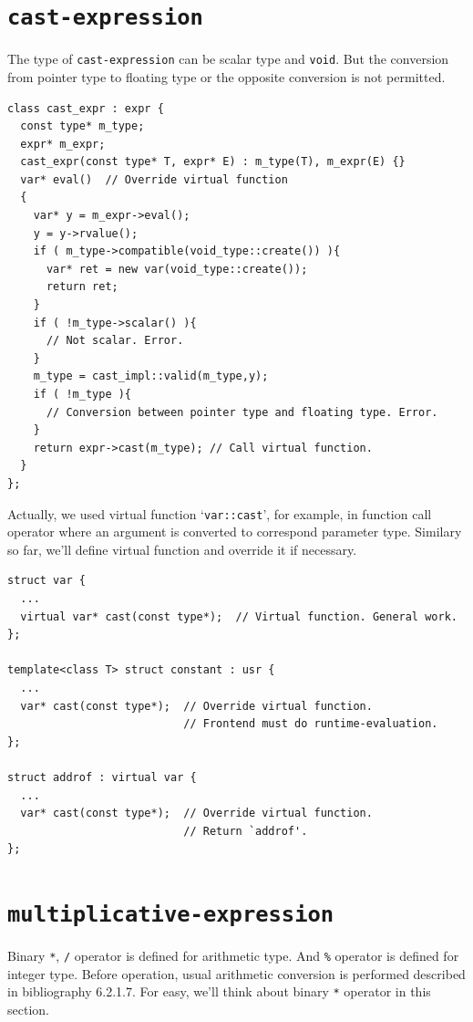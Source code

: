 \section{\tt{cast-expression}}

The type of {\tt{cast-expression}} can be scalar type
and {\tt{void}}. But the conversion from pointer type to floating type
or the opposite conversion is not permitted.
\begin{verbatim}
class cast_expr : expr {
  const type* m_type;
  expr* m_expr;
  cast_expr(const type* T, expr* E) : m_type(T), m_expr(E) {}
  var* eval()  // Override virtual function
  {
    var* y = m_expr->eval();
    y = y->rvalue();
    if ( m_type->compatible(void_type::create()) ){
      var* ret = new var(void_type::create());
      return ret;
    }
    if ( !m_type->scalar() ){
      // Not scalar. Error.
    }
    m_type = cast_impl::valid(m_type,y);
    if ( !m_type ){
      // Conversion between pointer type and floating type. Error.
    }
    return expr->cast(m_type); // Call virtual function.
  }
};
\end{verbatim}
Actually, we used virtual function `{\tt{var::cast}}', for example,
in function call operator where an argument is converted to
correspond parameter type. Similary so far,
we'll define virtual function and override it if necessary.
\begin{verbatim}
struct var {
  ...
  virtual var* cast(const type*);  // Virtual function. General work.
};

template<class T> struct constant : usr {
  ...
  var* cast(const type*);  // Override virtual function.
                           // Frontend must do runtime-evaluation.
};

struct addrof : virtual var {
  ...
  var* cast(const type*);  // Override virtual function.
                           // Return `addrof'.
};
\end{verbatim}

\section{\tt{multiplicative-expression}}
\label{expr_e011}

Binary {\tt{*}}, {\tt{/}} operator is defined for arithmetic type.
And {\tt{\%}} operator is defined for integer type.
Before operation, usual arithmetic conversion is performed
described in bibliography \cite{ISO} 6.2.1.7.
For easy, we'll think about binary {\tt{*}} operator in this section.

